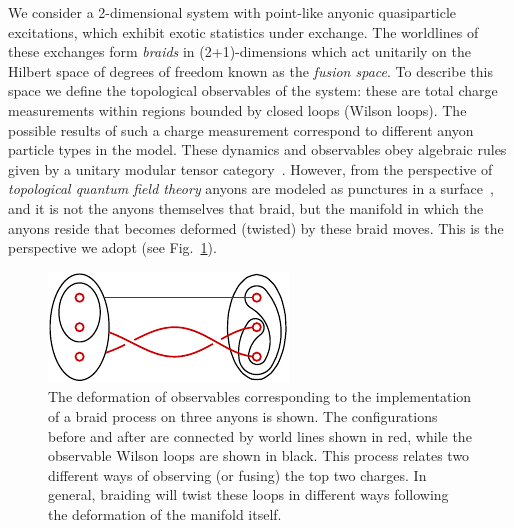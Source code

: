 \documentclass[aps, prl, letterpaper, twocolumn, superscriptaddress, notitlepage, 10pt]{revtex4-1}
\newcommand{\Fref}[1]{Fig.~\ref{#1}}
\begin{document}
We consider a 
2-dimensional system with
point-like anyonic quasiparticle excitations, which exhibit exotic statistics under exchange.
The worldlines of these exchanges form \emph{braids}
in (2+1)-dimensions
which act unitarily on the Hilbert space of degrees of freedom known as the \emph{fusion space}.
To describe this space we define
the topological observables of the system: these
are total charge measurements within regions bounded by 
closed loops (Wilson loops).
The possible results of such a charge measurement correspond to different anyon particle types in the model.
These dynamics and observables obey algebraic rules
given by a unitary modular tensor category~\cite{Wang2010b}. 
However, from the perspective of
\emph{topological quantum field theory}
anyons are modeled
as punctures in a surface~\cite{Pfeifer2014}, and it is not
the anyons themselves that braid,
but the manifold in which the anyons reside 
that becomes deformed (twisted) by these braid moves.
This is the perspective we adopt (see \Fref{f:braidloop}).

\begin{figure}[t!]
\begin{center}
    \includegraphics[]{pic-braid-loop.pdf}
\caption{
The deformation of observables corresponding to the implementation of a braid process on three anyons is shown. The configurations before and after are connected by world lines shown in red, while the observable Wilson loops are shown in black.
This process relates two different ways of observing (or fusing) the top two charges.
In general, braiding will twist these loops in different ways following
the deformation of the manifold itself.
\label{f:braidloop}
}
\end{center}
\vspace{-10pt}
\end{figure}
\end{document}

